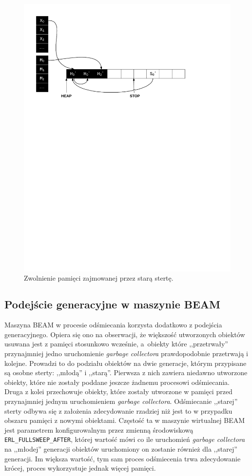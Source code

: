 \begin{figure}[h]
\centerline{\includegraphics[scale=0.75, clip, trim=10mm 180mm 45mm 10mm]{gc_6}}
\caption{Zwolnienie pamięci zajmowanej przez starą stertę.}
\label{fig:gc6}
\end{figure}

\subsection{Podejście generacyjne w maszynie BEAM}
\label{sub:gcGeneracje}

Maszyna BEAM w procesie odśmiecania korzysta dodatkowo z podejścia generacyjnego.
Opiera się ono na obserwacji, że większość utworzonych obiektów usuwana jest z pamięci stosunkowo wcześnie, a~obiekty które ,,przetrwały'' przynajmniej jedno uruchomienie \emph{garbage collectora} prawdopodobnie przetrwają i kolejne.
Prowadzi to do podziału obiektów na dwie generacje, którym przypisane są osobne sterty: ,,młodą'' i ,,starą''.
Pierwsza z nich zawiera niedawno utworzone obiekty, które nie zostały poddane jeszcze żadnemu procesowi odśmiecania.
Druga z kolei przechowuje obiekty, które zostały utworzone w pamięci przed przynajmniej jednym uruchomieniem \emph{garbage collectora}.
Odśmiecanie ,,starej'' sterty odbywa się z założenia zdecydowanie rzadziej niż jest to w przypadku obszaru pamięci z nowymi obiektami.
Częstość ta w maszynie wirtualnej BEAM jest parametrem konfigurowalnym przez zmienną środowiskową \texttt{ERL\_FULLSWEEP\_AFTER}, której wartość mówi co ile uruchomień \emph{garbage collectora} na ,,młodej'' generacji obiektów uruchomiony on zostanie również dla ,,starej'' generacji.
Im większa wartość, tym sam proces odśmiecenia trwa zdecydowanie krócej, proces wykorzystuje jednak więcej pamięci.

